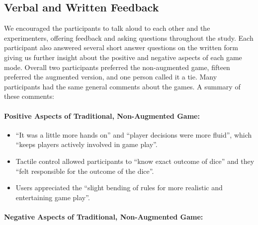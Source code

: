 \documentclass[review]{vgtc}                 %
\begin{document}
\subsection{Verbal and Written Feedback}

We encouraged the participants to talk aloud to each other and the
experimenters, offering feedback and asking questions throughout the
study.  Each participant also answered several short answer questions
on the written form giving us further insight about the positive and
negative aspects of each game mode.  Overall two participants
preferred the non-augmented game, fifteen preferred the augmented
version, and one person called it a tie.  Many participants had the
same general comments about the games.  A summary of these comments:

\newcommand{\mysep}{-0.08in}

\paragraph{Positive Aspects of Traditional, Non-Augmented Game:}

\begin{itemize}

\vspace{-0.05in}

\item 
``It was a little more hands on'' and
``player decisions were more fluid'', which
``keeps players actively involved in game play''.\vspace{\mysep}

\item 
Tactile control allowed participants to ``know exact outcome of dice''
and they ``felt responsible for the outcome of the
dice''.\vspace{\mysep}

\item 
Users appreciated the
``slight bending of rules for more realistic and entertaining game play''.



\end{itemize}

\paragraph{Negative Aspects of Traditional, Non-Augmented Game:}
\end{document}

